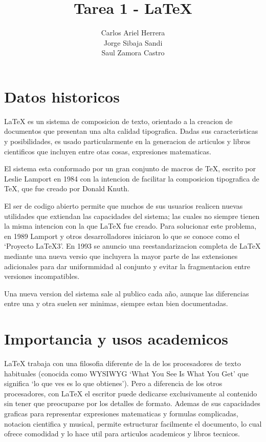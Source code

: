 \documentclass[11pt]{article}
\title{\textbf{Tarea 1 - \LaTeX{}}}
\author{Carlos Ariel Herrera\\Jorge Sibaja Sandi\\Saul Zamora Castro}
\date{}
\begin{document}
\maketitle

\newpage

\tableofcontents

\newpage

\section{Datos historicos}
\LaTeX{} es un sistema de composicion de texto, orientado a la creacion de documentos que presentan una alta calidad tipografica. Dadas sus caracteristicas y posibilidades, es usado particularmente en la generacion de articulos y libros cientificos que incluyen entre otas cosas, expresiones matematicas.

El sistema esta conformado por un gran conjunto de macros de TeX, escrito por Leslie Lamport en 1984 con la intencion de facilitar la composicion tipografica de TeX, que fue creado por Donald Knuth.

El ser de codigo abierto permite que muchos de sus usuarios realicen nuevas utilidades que extiendan las capacidades del sistema; las cuales no siempre tienen la misma intencion con la que \LaTeX{} fue creado. Para solucionar este problema, en 1989 Lamport y otros desarrolladores iniciaron lo que se conoce como el `Proyecto LaTeX3'. En 1993 se anuncio una reestandarizacion completa de \LaTeX{} mediante una nueva versio que incluyera la mayor parte de las extensiones adicionales para dar uniformmidad al conjunto y evitar la fragmentacion entre versiones incompatibles.

Una nueva version del sistema sale al publico cada año, aunque las diferencias entre una y otra suelen ser minimas, siempre estan bien documentadas.

\section{Importancia y usos academicos}
\LaTeX{} trabaja con una filosofia diferente de la de los procesadores de texto habituales (conocida como WYSIWYG `What You See Is What You Get' que significa `lo que ves es lo que obtienes'). Pero a diferencia de los otros procesadores, con \LaTeX{} el escritor puede dedicarse exclusivamente al contenido sin tener que preocuparse por los detalles de formato. Ademas de sus capacidades graficas para representar expresiones matematicas y formulas complicadas, notacion cientifica y musical, permite estructurar facilmente el documento, lo cual ofrece comodidad y lo hace util para articulos academicos y libros tecnicos.
\end{document}

